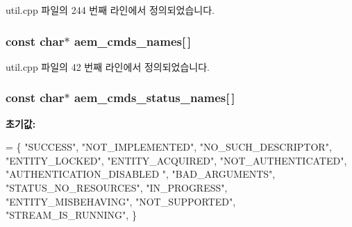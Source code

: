 util.\+cpp 파일의 244 번째 라인에서 정의되었습니다.

\subsubsection[{\texorpdfstring{aem\+\_\+cmds\+\_\+names}{aem_cmds_names}}]{\setlength{\rightskip}{0pt plus 5cm}const char$\ast$ aem\+\_\+cmds\+\_\+names\mbox{[}$\,$\mbox{]}}\hypertarget{namespaceavdecc__lib_1_1utility_af0c1057de627c1dae00680009dc11782}{}\label{namespaceavdecc__lib_1_1utility_af0c1057de627c1dae00680009dc11782}


util.\+cpp 파일의 42 번째 라인에서 정의되었습니다.

\subsubsection[{\texorpdfstring{aem\+\_\+cmds\+\_\+status\+\_\+names}{aem_cmds_status_names}}]{\setlength{\rightskip}{0pt plus 5cm}const char$\ast$ aem\+\_\+cmds\+\_\+status\+\_\+names\mbox{[}$\,$\mbox{]}}\hypertarget{namespaceavdecc__lib_1_1utility_a18e2c784f81334113396eb2913112144}{}\label{namespaceavdecc__lib_1_1utility_a18e2c784f81334113396eb2913112144}
{\bfseries 초기값\+:}
\begin{DoxyCode}
=
        \{
            \textcolor{stringliteral}{"SUCCESS"},                  
            \textcolor{stringliteral}{"NOT\_IMPLEMENTED"},          
            \textcolor{stringliteral}{"NO\_SUCH\_DESCRIPTOR"},       
            \textcolor{stringliteral}{"ENTITY\_LOCKED"},            
            \textcolor{stringliteral}{"ENTITY\_ACQUIRED"},          
            \textcolor{stringliteral}{"NOT\_AUTHENTICATED"},        
            \textcolor{stringliteral}{"AUTHENTICATION\_DISABLED "}, 
            \textcolor{stringliteral}{"BAD\_ARGUMENTS"},            
            \textcolor{stringliteral}{"STATUS\_NO\_RESOURCES"},      
            \textcolor{stringliteral}{"IN\_PROGRESS"},              
            \textcolor{stringliteral}{"ENTITY\_MISBEHAVING"},       
            \textcolor{stringliteral}{"NOT\_SUPPORTED"},            
            \textcolor{stringliteral}{"STREAM\_IS\_RUNNING"},        
    \}
\end{DoxyCode}


